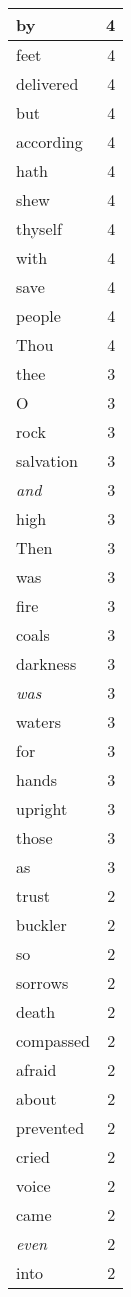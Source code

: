 \begin{center}
\begin{longtable}{l|r}
by & 4 \\ \hline
feet & 4 \\ \hline
delivered & 4 \\ \hline
but & 4 \\ \hline
according & 4 \\ \hline
hath & 4 \\ \hline
shew & 4 \\ \hline
thyself & 4 \\ \hline
with & 4 \\ \hline
save & 4 \\ \hline
people & 4 \\ \hline
Thou & 4 \\ \hline
thee & 3 \\ \hline
O & 3 \\ \hline
rock & 3 \\ \hline
salvation & 3 \\ \hline
\emph{and} & 3 \\ \hline
high & 3 \\ \hline
Then & 3 \\ \hline
was & 3 \\ \hline
fire & 3 \\ \hline
coals & 3 \\ \hline
darkness & 3 \\ \hline
\emph{was} & 3 \\ \hline
waters & 3 \\ \hline
for & 3 \\ \hline
hands & 3 \\ \hline
upright & 3 \\ \hline
those & 3 \\ \hline
as & 3 \\ \hline
trust & 2 \\ \hline
buckler & 2 \\ \hline
so & 2 \\ \hline
sorrows & 2 \\ \hline
death & 2 \\ \hline
compassed & 2 \\ \hline
afraid & 2 \\ \hline
about & 2 \\ \hline
prevented & 2 \\ \hline
cried & 2 \\ \hline
voice & 2 \\ \hline
came & 2 \\ \hline
\emph{even} & 2 \\ \hline
into & 2 \\ \hline

\end{longtable}
\end{center}
